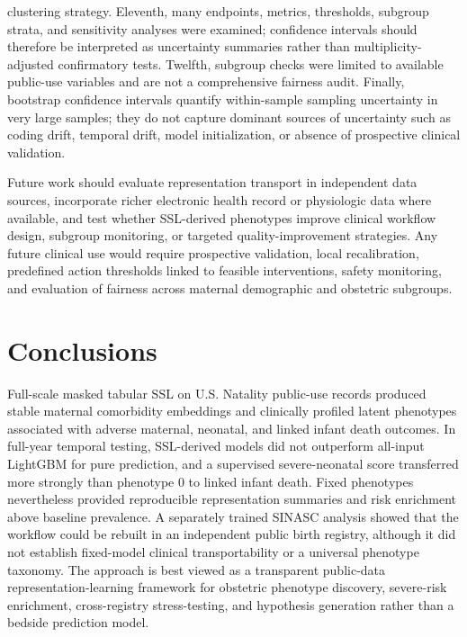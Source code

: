 \documentclass[pdflatex,sn-vancouver-num]{sn-jnl}
\begin{document}
clustering strategy. Eleventh, many endpoints, metrics, thresholds, subgroup strata, and sensitivity analyses were examined; confidence intervals should therefore be interpreted as uncertainty summaries rather than multiplicity-adjusted confirmatory tests. Twelfth, subgroup checks were limited to available public-use variables and are not a comprehensive fairness audit. Finally, bootstrap confidence intervals quantify within-sample sampling uncertainty in very large samples; they do not capture dominant sources of uncertainty such as coding drift, temporal drift, model initialization, or absence of prospective clinical validation.

Future work should evaluate representation transport in independent data sources, incorporate richer electronic health record or physiologic data where available, and test whether SSL-derived phenotypes improve clinical workflow design, subgroup monitoring, or targeted quality-improvement strategies. Any future clinical use would require prospective validation, local recalibration, predefined action thresholds linked to feasible interventions, safety monitoring, and evaluation of fairness across maternal demographic and obstetric subgroups.

\section{Conclusions}\label{sec:conclusions}

Full-scale masked tabular SSL on U.S. Natality public-use records produced stable maternal comorbidity embeddings and clinically profiled latent phenotypes associated with adverse maternal, neonatal, and linked infant death outcomes. In full-year temporal testing, SSL-derived models did not outperform all-input LightGBM for pure prediction, and a supervised severe-neonatal score transferred more strongly than phenotype 0 to linked infant death. Fixed phenotypes nevertheless provided reproducible representation summaries and risk enrichment above baseline prevalence. A separately trained SINASC analysis showed that the workflow could be rebuilt in an independent public birth registry, although it did not establish fixed-model clinical transportability or a universal phenotype taxonomy. The approach is best viewed as a transparent public-data representation-learning framework for obstetric phenotype discovery, severe-risk enrichment, cross-registry stress-testing, and hypothesis generation rather than a bedside prediction model.

\backmatter
\end{document}
